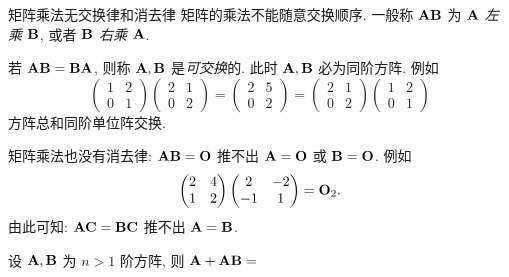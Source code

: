 \begin{frame}{矩阵乘法无交换律和消去律}
	\onslide<+->
	\alert{矩阵的乘法不能随意交换顺序}.
	\onslide<+->
	一般称 ${\mathbf{A}}{\mathbf{B}}$ 为 \emph{${\mathbf{A}}$ 左乘 ${\mathbf{B}}$}, 或者 \emph{${\mathbf{B}}$ 右乘 ${\mathbf{A}}$}.

	\onslide<+->
	若 ${\mathbf{A}}{\mathbf{B}}={\mathbf{B}}{\mathbf{A}}$, 则称 ${\mathbf{A}},{\mathbf{B}}$ 是\emph{可交换}的.
	\onslide<+->
	此时 ${\mathbf{A}},{\mathbf{B}}$ \alert{必为同阶方阵}.
	\onslide<+->
	例如
	\[\begin{pmatrix}
		1&2\\0&1
	\end{pmatrix}\begin{pmatrix}
		2&1\\0&2
	\end{pmatrix}=\begin{pmatrix}
		2&5\\0&2
	\end{pmatrix}=\begin{pmatrix}
		2&1\\0&2
	\end{pmatrix}\begin{pmatrix}
		1&2\\0&1
	\end{pmatrix}\]
	\onslide<+->
	方阵总和同阶单位阵交换.

	\onslide<+->
	矩阵乘法也没有消去律: ${\mathbf{A}}{\mathbf{B}}={\mathbf{O}}$ 推不出 ${\mathbf{A}}={\mathbf{O}}$ 或 ${\mathbf{B}}={\mathbf{O}}$.
	\onslide<+->
	例如
	\[\begin{pmatrix}
		2&4\\1&2
	\end{pmatrix}\begin{pmatrix}
		2&-2\\-1&1
	\end{pmatrix}={\mathbf{O}}_2.\]
	\onslide<+->
	由此可知: ${\mathbf{A}}{\mathbf{C}}={\mathbf{B}}{\mathbf{C}}$ 推不出 ${\mathbf{A}}={\mathbf{B}}$. 

	\onslide<+->
	\begin{exercise}
		设 ${\mathbf{A}},{\mathbf{B}}$ 为 $n>1$ 阶方阵, 则 ${\mathbf{A}}+{\mathbf{A}}{\mathbf{B}}=$
	\end{exercise}
\end{frame}


